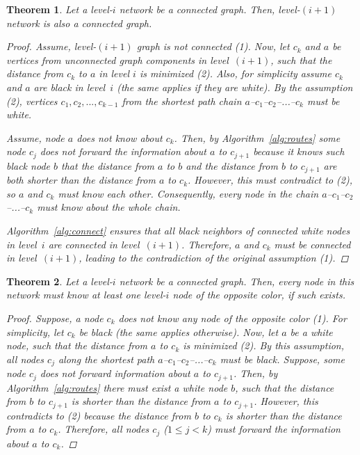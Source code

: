 \documentclass[14pt]{extarticle}
\newtheorem{thm}{Theorem}
\theoremstyle{definition}
\begin{document}
\begin{thm}
    Let a level-$i$ network be a connected graph. Then, level-$(i+1)$ network is also a connected graph.

    \begin{proof}
        Assume, level-$(i+1)$ graph is not connected (1). Now, let $c_k$ and $a$ be vertices from unconnected graph components in level~$(i+1)$, such that the distance from $c_k$ to $a$ in level $i$ is minimized (2). Also, for simplicity assume $c_k$ and $a$ are black in level~$i$ (the same applies if they are white). By the assumption (2), vertices $c_1,c_2,...,c_{k-1}$ from the shortest path chain $a$--$c_1$--$c_2$--...--$c_k$ must be white.

        Assume, node $a$ does not know about $c_k$. Then, by Algorithm~\ref{alg:routes} some node $c_j$ does not forward the information about $a$ to $c_{j+1}$ because it knows such black node $b$ that the distance from $a$ to $b$ and the distance from $b$ to $c_{j+1}$ are both shorter than the distance from $a$ to $c_k$. However, this must contradict to (2), so $a$ and $c_k$ must know each other. Consequently, every node in the chain $a$--$c_1$--$c_2$--...--$c_k$ must know about the whole chain.

        Algorithm~\ref{alg:connect} ensures that all black neighbors of connected white nodes in level~$i$ are connected in level~$(i+1)$. Therefore, $a$ and $c_k$ must be connected in level~$(i+1)$, leading to the contradiction of the original assumption (1).
    \end{proof}

    \label{thm:connectivity-levels}
\end{thm}

\begin{thm}
    Let a level-$i$ network be a connected graph. Then, every node in this network must know at least one level-$i$ node of the opposite color, if such exists.

    \begin{proof}
        Suppose, a node $c_k$ does not know any node of the opposite color (1). For simplicity, let $c_k$ be black (the same applies otherwise). Now, let $a$ be a white node, such that the distance from $a$ to $c_k$ is minimized (2). By this assumption, all nodes $c_j$ along the shortest path $a$--$c_1$--$c_2$--...--$c_k$ must be black. Suppose, some node $c_j$ does not forward information about $a$ to $c_{j+1}$. Then, by Algorithm~\ref{alg:routes} there must exist a white node $b$, such that the distance from $b$ to $c_{j+1}$ is shorter than the distance from $a$ to $c_{j+1}$. However, this contradicts to (2) because the distance from $b$ to $c_k$ is shorter than the distance from $a$ to $c_k$. Therefore, all nodes $c_j$ ($1 \le j < k$) must forward the information about $a$ to $c_k$.
    \end{proof}

    \label{thm:connectivity-colors}
\end{thm}
\end{document}
